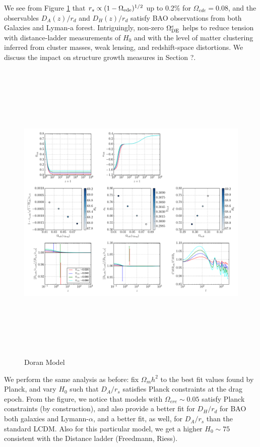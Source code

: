 \documentclass[preprintnumbers,amsmath,amssymb,prd,superscriptaddress,notitlepag
e, twocolumn]{revtex4-1}
\newcommand{\OmegaDE}{\Omega_{\rm DE}}
\begin{document}
 


We see from Figure \ref{fig:fig1} that $r_s \propto (1-\Omega_{\rm ede})^{1/2}$ up to 0.2\%
for $\Omega_{ede}=0.08$, and the observables $D_A(z)/r_d $ and $D_H(z)/r_d$ satisfy 
 BAO observations from both Galaxies and Lyman-a forest.
%
Intriguingly, non-zero $\OmegaDE^e$ 
helps to reduce tension
with distance-ladder measurements of $H_0$ and with the level of
matter clustering inferred from cluster masses, weak lensing,
and redshift-space distortions.  We discuss the impact on structure
growth measures in Section ?.


\begin{figure}[h!]
\hspace*{-0.in}
  \includegraphics[trim = 2mm 2mm 3mm 1mm, clip, width=18cm, height=15cm ]{test_ede_Om.pdf}
 \caption{Doran Model}
 \label{fig:fig1}
\end{figure} 




%

We perform the same analysis as before: fix
 $\Omega_{m}h^2$  to the best fit values found
by Planck, and vary $H_0$ such that $D_A/r_s$ satisfies Planck constraints at the drag epoch.
%
From the figure, we notice that models with $\Omega_{ere} \sim 0.05$ satisfy Planck constraints (by construction),
and also provide a better fit for $D_H/r_d$ for BAO both galaxies and Lymann-$\alpha$, and a better fit, as well, for $D_A/r_s$
than the standard LCDM. Also for this particular model, we get a higher $H_0 \sim 75$ consistent with the Distance
ladder (Freedmann, Riess).
\end{document}
